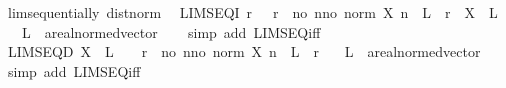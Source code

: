 \begin{isabellebody}
%
\isadelimproof
%
\endisadelimproof
%
\isatagproof
{}\isamarkupfalse%
\ lim{\isacharunderscore}{\kern0pt}sequentially\ dist{\isacharunderscore}{\kern0pt}norm\ \isacommand{{\isachardot}{\kern0pt}{\isachardot}{\kern0pt}}\isamarkupfalse%
%
\endisatagproof
{\isafoldproof}%
%
\isadelimproof
\isanewline
%
\endisadelimproof
\isanewline
{}\isamarkupfalse%
\ LIMSEQ{\isacharunderscore}{\kern0pt}I{\isacharcolon}{\kern0pt}\ {\isachardoublequoteopen}{\isacharparenleft}{\kern0pt}{\isasymAnd}r{\isachardot}{\kern0pt}\ {}\ {\isacharless}{\kern0pt}\ r\ {\isasymLongrightarrow}\ {\isasymexists}no{\isachardot}{\kern0pt}\ {\isasymforall}n{\isasymge}no{\isachardot}{\kern0pt}\ norm\ {\isacharparenleft}{\kern0pt}X\ n\ {\isacharminus}{\kern0pt}\ L{\isacharparenright}{\kern0pt}\ {\isacharless}{\kern0pt}\ r{\isacharparenright}{\kern0pt}\ {\isasymLongrightarrow}\ X\ {\isasymlonglonglongrightarrow}\ L{\isachardoublequoteclose}\isanewline
\ \ \ L\ {\isacharcolon}{\kern0pt}{\isacharcolon}{\kern0pt}\ {\isachardoublequoteopen}{\isacharprime}{\kern0pt}a{\isacharcolon}{\kern0pt}{\isacharcolon}{\kern0pt}real{\isacharunderscore}{\kern0pt}normed{\isacharunderscore}{\kern0pt}vector{\isachardoublequoteclose}\isanewline
%
\isadelimproof
\ \ %
\endisadelimproof
%
\isatagproof
{}\isamarkupfalse%
\ {\isacharparenleft}{\kern0pt}simp\ add{\isacharcolon}{\kern0pt}\ LIMSEQ{\isacharunderscore}{\kern0pt}iff{\isacharparenright}{\kern0pt}%
\endisatagproof
{\isafoldproof}%
%
\isadelimproof
\isanewline
%
\endisadelimproof
\isanewline
{}\isamarkupfalse%
\ LIMSEQ{\isacharunderscore}{\kern0pt}D{\isacharcolon}{\kern0pt}\ {\isachardoublequoteopen}X\ {\isasymlonglonglongrightarrow}\ L\ {\isasymLongrightarrow}\ {}\ {\isacharless}{\kern0pt}\ r\ {\isasymLongrightarrow}\ {\isasymexists}no{\isachardot}{\kern0pt}\ {\isasymforall}n{\isasymge}no{\isachardot}{\kern0pt}\ norm\ {\isacharparenleft}{\kern0pt}X\ n\ {\isacharminus}{\kern0pt}\ L{\isacharparenright}{\kern0pt}\ {\isacharless}{\kern0pt}\ r{\isachardoublequoteclose}\isanewline
\ \ \ L\ {\isacharcolon}{\kern0pt}{\isacharcolon}{\kern0pt}\ {\isachardoublequoteopen}{\isacharprime}{\kern0pt}a{\isacharcolon}{\kern0pt}{\isacharcolon}{\kern0pt}real{\isacharunderscore}{\kern0pt}normed{\isacharunderscore}{\kern0pt}vector{\isachardoublequoteclose}\isanewline
%
\isadelimproof
\ \ %
\endisadelimproof
%
\isatagproof
{}\isamarkupfalse%
\ {\isacharparenleft}{\kern0pt}simp\ add{\isacharcolon}{\kern0pt}\ LIMSEQ{\isacharunderscore}{\kern0pt}iff{\isacharparenright}{\kern0pt}%

\end{isabellebody}
